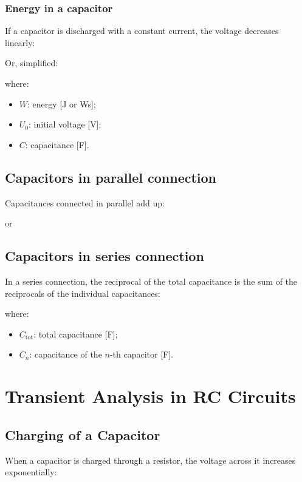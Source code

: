 \documentclass{article}
\begin{document}
\subsubsection{Energy in a capacitor}
If a capacitor is discharged with a constant current, the voltage decreases linearly:


Or, simplified:

where:
\begin{itemize}
    \item $W$: energy [J or Ws];
    \item $U_0$: initial voltage [V];
    \item $C$: capacitance [F].
\end{itemize}

\subsection{Capacitors in parallel connection}
Capacitances connected in parallel add up:

or


\subsection{Capacitors in series connection}
In a series connection, the reciprocal of the total capacitance is the sum of the reciprocals of the individual capacitances:

where:
\begin{itemize}
    \item $C_{\text{tot}}$: total capacitance [F];
    \item $C_n$: capacitance of the $n$-th capacitor [F].
\end{itemize}

\section{Transient Analysis in RC Circuits}
\subsection{Charging of a Capacitor}
When a capacitor is charged through a resistor, the voltage across it increases exponentially:
\end{document}
